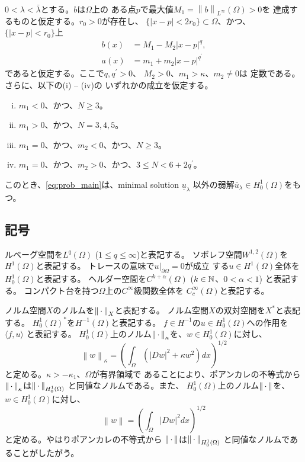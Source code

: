 \begin{thm} \label{thm:second_solution}
 $0 < \lambda < \bar{\lambda}$とする。$b$は$\Omega$上の
 ある点$p$で最大値$M_1 = \left\| b \right\|_{L^\infty}(\Omega) > 0$を
 達成するものと仮定する。$r_0 > 0$が存在し、
 $\{ \lvert x - p \rvert < 2r_0 \} \subset \Omega$、かつ、
 $\{ \lvert x - p \rvert < r_0 \}$上
 \begin{align*}
  b(x) &= M_1 - M_2 \lvert x-p \rvert^q,  \\
  a(x) &= m_1 + m_2 \lvert x-p \rvert^{q^\prime}
 \end{align*}
 であると仮定する。ここで$q, q^\prime > 0$、
 $M_2 > 0$、$m_1 > \kappa$、$m_2 \neq 0$は
 定数である。さらに、以下の(i) -- (iv)の
 いずれかの成立を仮定する。
 \begin{enumerate}[(i)]
  \item $m_1 < 0$、かつ、$N \geq 3$。
  \item $m_1 > 0$、かつ、$N = 3, 4, 5$。
  \item $m_1 = 0$、かつ、$m_2 < 0$、かつ、$N \geq 3$。
  \item $m_1 = 0$、かつ、$m_2 > 0$、かつ、$3 \leq N < 6 + 2q^\prime$。
 \end{enumerate}
 このとき、\ref{eq:prob_main}は、minimal solution
 $\underline{u}_\lambda$
 以外の弱解$\bar{u}_\lambda \in H_0^1(\Omega)$をもつ。
\end{thm}

\subsection{記号}

ルベーグ空間を$L^q(\Omega)$ ($1 \leq q \leq \infty$)と表記する。
ソボレフ空間$W^{1, 2}(\Omega)$を$H^1(\Omega)$と表記する。
トレースの意味で$u |_{\partial \Omega} = 0$が成立
する$u \in H^1(\Omega)$全体を$H_0^1(\Omega)$と表記する。
ヘルダー空間を$C^{k + \alpha}(\Omega)$ ($k \in \mathbb{N}$、$0 < \alpha < 1$)
と表記する。
コンパクト台を持つ$\Omega$上の$C^\infty$級関数全体を
$C^\infty_c (\Omega)$と表記する。

ノルム空間$X$のノルムを$\left\|\, \cdot \, \right\|_X$と表記する。
ノルム空間$X$の双対空間を$X^*$と表記する。
$H_0^1(\Omega)^*$を$H^{-1}(\Omega)$と表記する。
$f \in H^{-1}$の$u \in H_0^1(\Omega)$への作用を$\langle f, u \rangle$
と表記する。
$H_0^1(\Omega)$上のノルム$\left\|\, \cdot \, \right\|_{\kappa}$を、$w \in H_0^1(\Omega)$に対し、
\[
 \left\| w \right\|_\kappa = \left(\int_\Omega \left( \lvert Dw \rvert^2 +
 \kappa w ^2 \right) dx\right)^{1/2}
\]
と定める。$\kappa > -\kappa_1$、$\Omega$が有界領域で
あることにより、ポアンカレの不等式から
$\left\|\, \cdot \, \right\|_\kappa$は$\left\|\, \cdot \, \right\|_{H_0^1(\Omega)}$
と同値なノルムである。また、
$H_0^1(\Omega)$上のノルム$\left\|\, \cdot \, \right\|$を、$w \in H_0^1(\Omega)$に対し、
\[
 \left\| w \right\| = \left(\int_\Omega \lvert Dw \rvert^2 dx\right)^{1/2}
\]
と定める。やはりポアンカレの不等式から
$\left\|\, \cdot \, \right\|$は$\left\|\, \cdot \, \right\|_{H_0^1(\Omega)}$
と同値なノルムであることがしたがう。

